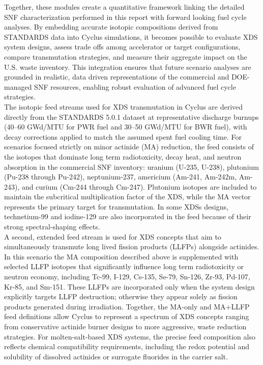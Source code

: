     Together, these modules create a quantitative framework linking the detailed SNF characterization performed in this report 
    with forward looking fuel cycle analyses. By embedding accurate isotopic compositions derived from STANDARDS data into 
    Cyclus simulations, it becomes possible to evaluate XDS system designs, assess trade offs among accelerator or target 
    configurations, compare transmutation strategies, and measure their aggregate impact on the U.S. waste inventory. 
    This integration ensures that future scenario analyses are grounded in realistic, data driven representations of 
    the commercial and DOE-managed SNF resources, enabling robust evaluation of advanced fuel cycle strategies.\\

    The isotopic feed streams used for XDS transmutation in Cyclus are derived directly from the STANDARDS 5.0.1 dataset at representative discharge burnups 
    (40–60 GWd/MTU for PWR fuel and 30–50 GWd/MTU for BWR fuel), with decay corrections applied to match the assumed spent fuel cooling time. 
    For scenarios focused strictly on minor actinide (MA) reduction, the feed consists of the isotopes that dominate long term radiotoxicity, decay heat, 
    and neutron absorption in the commercial SNF inventory: uranium (U-235, U-238), plutonium (Pu-238 through Pu-242), neptunium-237, 
    americium (Am-241, Am-242m, Am-243), and curium (Cm-244 through Cm-247). Plutonium isotopes are included to maintain the subcritical multiplication 
    factor of the XDS, while the MA vector represents the primary target for transmutation. In some XDSs designs, technetium-99 and iodine-129 are 
    also incorporated in the feed because of their strong spectral-shaping effects.~\cite{gohar_ads_2021}\\

    A second, extended feed stream is used for XDS concepts that aim to simultaneously transmute long lived fission products (LLFPs) alongside actinides. 
    In this scenario the MA composition described above is supplemented with selected LLFP isotopes that significantly influence long term radiotoxicity or 
    neutron economy, including Tc-99, I-129, Cs-135, Se-79, Sn-126, Zr-93, Pd-107, Kr-85, and Sm-151. 
    These LLFPs are incorporated only when the system design explicitly targets LLFP destruction; 
    otherwise they appear solely as fission products generated during irradiation. 
    Together, the MA-only and MA+LLFP feed definitions allow Cyclus to represent a spectrum of XDS concepts ranging from conservative 
    actinide burner designs to more aggressive, waste reduction strategies. For molten-salt-based XDS systems, 
    the precise feed composition also reflects chemical compatibility requirements, 
    including the redox potential and solubility of dissolved actinides or surrogate fluorides in the carrier salt.~\cite{herrera-martinez_transmutation_2007}\\

